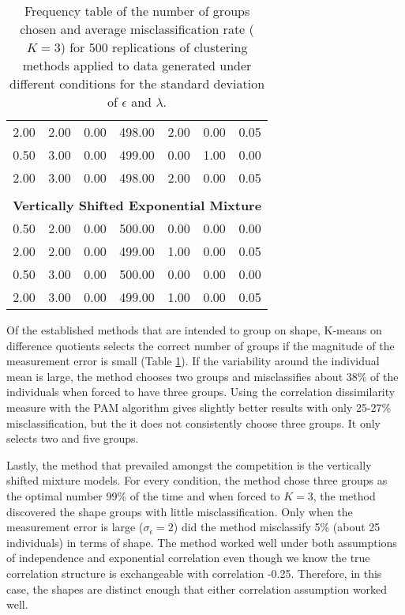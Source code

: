 \documentclass[12pt]{article}
\begin{document}
\begin{table}[ht]
\begin{center}
\begin{tabular}{cc|ccccc}
  2.00 & 2.00 & 0.00 & 498.00 & 2.00 & 0.00 & 0.05 \\ 
  0.50 & 3.00 & 0.00 & 499.00 & 0.00 & 1.00 & 0.00 \\ 
  2.00 & 3.00 & 0.00 & 498.00 & 2.00 & 0.00 & 0.05 \\ 
   \\ \multicolumn{7}{c}{\textbf{Vertically Shifted Exponential Mixture}}\\0.50 & 2.00 & 0.00 & 500.00 & 0.00 & 0.00 & 0.00 \\ 
  2.00 & 2.00 & 0.00 & 499.00 & 1.00 & 0.00 & 0.05 \\ 
  0.50 & 3.00 & 0.00 & 500.00 & 0.00 & 0.00 & 0.00 \\ 
  2.00 & 3.00 & 0.00 & 499.00 & 1.00 & 0.00 & 0.05 \\ 
   \hline\end{tabular}
\caption{Frequency table of the number of groups chosen and average misclassification rate ($K=3$) for 500 replications of clustering methods applied to data generated under different conditions for the standard deviation of $\epsilon$ and $\lambda$.}
\label{tab:freq1}
\end{center}
\end{table}

Of the established methods that are intended to group on shape, K-means on difference quotients selects the correct number of groups if the magnitude of the measurement error is small (Table \ref{tab:freq1}). If the variability around the individual mean is large, the method chooses two groups and misclassifies about 38\% of the individuals when forced to have three groups. Using the correlation dissimilarity measure with the PAM algorithm gives slightly better results with only 25-27\% misclassification, but the it does not consistently choose three groups. It only selects two and five groups.

Lastly, the method that prevailed amongst the competition is the vertically shifted mixture models. For every condition, the method chose three groups as the optimal number 99\% of the time and when forced to $K=3$, the method discovered the shape groups with little misclassification. Only when the measurement error is large ($\sigma_{\epsilon}=2$) did the method misclassify 5\% (about 25 individuals) in terms of shape. The method worked well under both assumptions of independence and exponential correlation even though we know the true correlation structure is exchangeable with correlation -0.25. Therefore, in this case, the shapes are distinct enough that either correlation assumption worked well.
\end{document}
